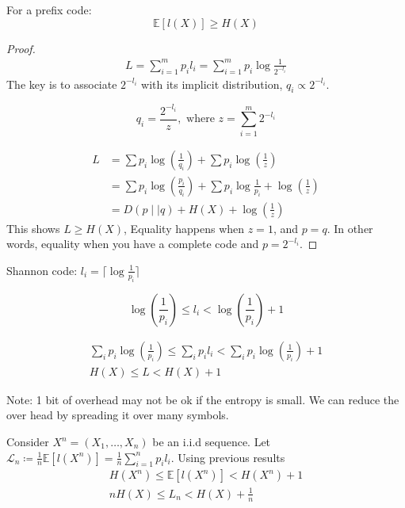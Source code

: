 \begin{thrm}{}{}
For a prefix code:
    \[
    \mathbb{E} \left[ l(X) \right] \geq H(X)
\]

\tcbline 
\begin{proof}
    \begin{align*}
        L = \sum_{i = 1}^{m}p _{i} l _{i} = \sum_{i = 1}^{m} p _{i}  \log \frac{1}{2^{- l_{i} }} 
    \end{align*}
The key is to associate \(2^{- l_{i} }\) with its implicit distribution, \(q_{i} \propto 2^{- l_{i} }\). 

\[
    q_{i} = \frac{2^{- l _{i} }}{z}, \text{ where } z = \sum_{i = 1}^{m} 2^{- l _{i} } 
    \]
    
\begin{align*}
    L &=  \sum p_{i} \log (\frac{1}{q_{i} }) + \sum p_{i} \log (\frac{1}{z})\\
    &= \sum p_{i} \log \left( \frac{p _{i} }{q _{i} }  \right) + \sum p_{i}  \log \frac{1}{p _{i} } + \log (\frac{1}{z})\\
    &= D(p \mid \mid q) + H(X) + \log (\frac{1}{z})
\end{align*}
This shows \(L \geq H(X)\), Equality happens when \(z = 1\), and \(p = q\). In other words, equality when you have a complete code and \(p = 2^{- l_{i} }\).  
\end{proof}

\end{thrm}

Shannon code: \(l_{i} = \lceil \log \frac{1}{p _{i} }  \rceil \) 

\[
    \log (\frac{1}{p _{i} }) \leq l_{i}  < \log (\frac{1}{p _{i} }) + 1
\]

\begin{align*}
    \sum_{i} p_{i} \log (\frac{1}{p _{i} }) \leq \sum_{  i} p_{i}   l _{i} < \sum_{i} p_{i} \log (\frac{1}{p _{i} }) + 1\\
    H(X) \leq L < H(X) + 1
\end{align*}


Note: 1 bit of overhead may not be ok if the entropy is small. We can reduce the over head by spreading it over many symbols. 

Consider \(X^n = (X_1, \dots ,X_{n} )\) be an i.i.d sequence. Let \(\mathcal{L} _{n} \coloneqq \frac{1}{n}\mathbb{E} \left[ l(X^n) \right] = \frac{1}{n } \sum_{i = 1}^n p_{i} l_{i}   \). Using previous results 
\begin{align*}
    H(X^n) \leq \mathbb{E} [l(X^n)] < H(X^n) + 1 \\
    nH(X)\leq L_{n} < H(X) + \frac{1}{n}
\end{align*}

